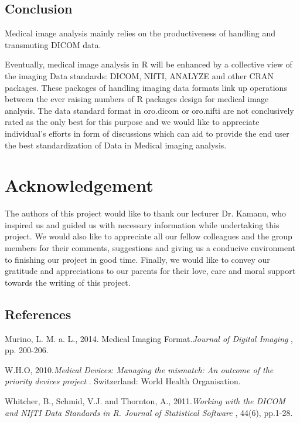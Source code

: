 \documentclass[10pt]{article}\usepackage[]{graphicx}\usepackage[]{color}
\begin{document}
{\begin{center}
\section*{Conclusion}
\end{center}
Medical image analysis mainly relies on the productiveness of handling and transmuting DICOM data.\par Eventually, medical image analysis in R will be enhanced by a collective view of the imaging Data standards: DICOM, NIfTI, ANALYZE and other CRAN packages. These packages of  handling imaging data formats link up operations between the ever raising numbers of R packages design for medical image analysis. The data standard format in oro.dicom or oro.nifti are not conclusively rated as the only best for this purpose and we would like to appreciate individual's efforts in form of discussions which can aid to provide the end user the best standardization of Data in Medical imaging analysis.


\section*{Acknowledgement}



The authors of this project would like to thank our lecturer Dr. Kamanu, who inspired us and guided us with necessary information while undertaking this project. We would also like to appreciate all our fellow colleagues and the group members for their comments, suggestions and giving us a conducive environment to finishing our project in good time. Finally, we would like to convey our gratitude and appreciations to our parents for their love, care and moral support towards the writing of this project. 

 
\begin{center}
\section*{References}
\end{center}
Murino, L. M. a. L., 2014. Medical Imaging Format.\textit{Journal of Digital Imaging} , pp. 200-206. 
	
W.H.O, 2010.\textit{Medical Devices: Managing the mismatch: An outcome of the priority devices project} . Switzerland: World Health Organisation. 
 
Whitcher, B., Schmid, V.J. and Thornton, A., 2011.\textit{Working with the DICOM and NIfTI Data Standards in R. Journal of Statistical Software} , 44(6), pp.1-28. 
 
}
\end{document}
